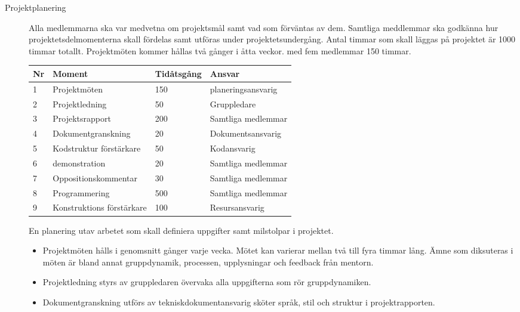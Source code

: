 \documentclass[a4paper]{article}
\begin{document}
\begin{description}
 \item[Projektplanering] Alla medlemmarna ska var medvetna om projektsmål samt vad som förväntas av dem. Samtliga meddlemmar ska godkänna hur projektetsdelmomenterna skall fördelas samt utföras under projektetsundergång. Antal timmar som skall läggas på projektet är 1000 timmar totallt. Projektmöten kommer hållas två gånger i åtta veckor. med fem medlemmar 150 timmar.


\begin{tabular}{ |p{0.5cm}||p{4cm}|p{2cm}|p{4cm}|  }
\hline
  \rowcolor{lightgray}
  Nr & Moment & Tidåtsgång & Ansvar\\
 \hline
 1  &  Projektmöten             & 150  &planeringsansvarig\\
    \rowcolor{lightgray}
 2  &  Projektledning           & 50   &Gruppledare\\
 3  &  Projektsrapport          & 200  &Samtliga medlemmar\\
    \rowcolor{lightgray}
 4  &  Dokumentgranskning       & 20   &Dokumentsansvarig\\
 5  &  Kodstruktur förstärkare  & 50   &Kodansvarig\\
    \rowcolor{lightgray}
 6  &  demonstration            & 20   &Samtliga medlemmar \\
 7  &  Oppositionskommentar     & 30   &Samtliga medlemmar\\
    \rowcolor{lightgray}
 8 &  Programmering             & 500  &Samtliga medlemmar\\
 9 &  Konstruktions förstärkare & 100  &Resursansvarig\\
 \hline
\end{tabular}




 En planering utav arbetet som skall definiera uppgifter samt milstolpar i projektet.

\begin{itemize}
 \item Projektmöten hålls i genomsnitt  gånger varje vecka. Mötet kan varierar mellan två till fyra timmar lång. Ämne som diksuteras i möten är bland annat gruppdynamik, processen, upplysningar och feedback från mentorn.
 
 \item Projektledning styrs av gruppledaren övervaka alla uppgifterna som rör gruppdynamiken. 
 
 \item Dokumentgranskning utförs av tekniskdokumentansvarig sköter språk, stil och struktur i projektrapporten. 
 

\end{itemize}
\end{description}
\end{document}
